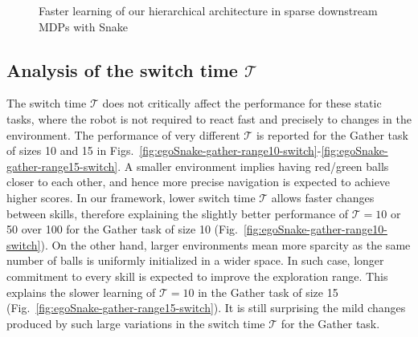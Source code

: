 \documentclass{article} %
\begin{document}
\begin{figure}[h!]
	\centering
	\caption{Faster learning of our hierarchical architecture in sparse downstream MDPs with Snake}
	\label{fig:egoSnake-learning-curves}
\end{figure}

\subsection{Analysis of the switch time $\mathcal{T}$}
\label{sec:switch_time}
The switch time $\mathcal{T}$ does not critically affect the performance for these static tasks, where the robot is not required to react fast and precisely to changes in the environment. The performance of very different $\mathcal{T}$ is reported for the Gather task of sizes 10 and 15 in Figs.\ \ref{fig:egoSnake-gather-range10-switch}-\ref{fig:egoSnake-gather-range15-switch}. A smaller environment implies having red/green balls closer to each other, and hence more precise navigation is expected to achieve higher scores. In our framework, lower switch time $\mathcal{T}$ allows faster changes between skills, therefore explaining the slightly better performance of $\mathcal{T}=10$ or 50 over 100 for the Gather task of size 10 (Fig.\ \ref{fig:egoSnake-gather-range10-switch}). On the other hand, larger environments mean more sparcity as the same number of balls is uniformly initialized in a wider space. In such case, longer commitment to every skill is expected to improve the exploration range. This explains the slower learning of $\mathcal{T}=10$ in the Gather task of size 15 (Fig.\ \ref{fig:egoSnake-gather-range15-switch}). It is still surprising the mild changes produced by such large variations in the switch time $\mathcal{T}$ for the Gather task.
\end{document}
